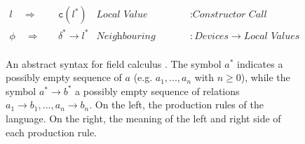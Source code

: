 \begin{figure}
{\begin{minipage}{0.95\textwidth}
\begin{align*}
        l \quad\Rightarrow\quad    & \texttt{c}(l^*)                      & \textit{Local Value}          & : \textit{Constructor Call}                          \\
        \phi \quad\Rightarrow\quad & \delta^* \rightarrow l^*             & \textit{Neighbouring Value}   & : \textit{Devices} \rightarrow \textit{Local Values} \\
      \end{align*}
    \end{minipage}
  }
  \caption{
  An abstract syntax for field calculus \cite{FieldCalculus-AggregateComputing}.
  The symbol $a^*$ indicates a possibly empty sequence of $a$ (e.g.
  $a_1,...,a_n$ with $n \geq 0$), while the symbol $a^*{\rightarrow}b^*$ a
  possibly empty sequence of relations $a_1{\rightarrow}b_1,...,a_n{\rightarrow}b_n$.
  On the left, the production rules of the language. On the right, the
  meaning of the left and right side of each production rule.
  }
  \label{figure:field-calculus-language}
\end{figure}